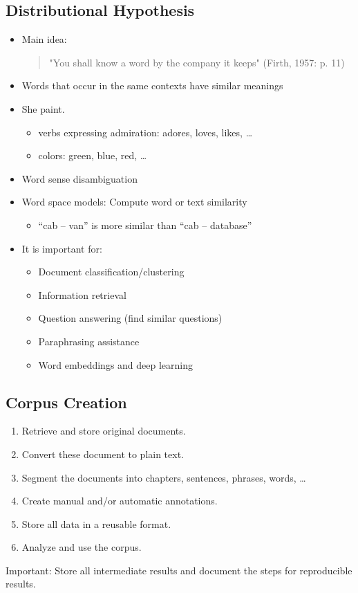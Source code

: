 		\subsection{Distributional Hypothesis}
			\begin{itemize}
				\item Main idea: \begin{quote}
						"You shall know a word by the company it keeps" (Firth, 1957: p. 11)
					\end{quote}
				\item Words that occur in the same contexts have similar meanings
				\item She   paint.
					\begin{itemize}
						\item verbs expressing admiration: adores, loves, likes, \dots
						\item colors: green, blue, red, \dots
					\end{itemize}
				\item Word sense disambiguation
				\item Word space models: Compute word or text similarity
					\begin{itemize}
						\item \enquote{cab – van} is more similar than \enquote{cab – database}
					\end{itemize}
				\item It is important for:
					\begin{itemize}
						\item Document classification/clustering
						\item Information retrieval
						\item Question answering (find similar questions)
						\item Paraphrasing assistance
						\item Word embeddings and deep learning
					\end{itemize}
			\end{itemize}

		\subsection{Corpus Creation} %
			\begin{enumerate}
				\item Retrieve and store original documents.
				\item Convert these document to plain text.
				\item Segment the documents into chapters, sentences, phrases, words, \dots
				\item Create manual and/or automatic annotations.
				\item Store all data in a reusable format.
				\item Analyze and use the corpus.
			\end{enumerate}
			Important: Store all intermediate results and document the steps for reproducible results.

